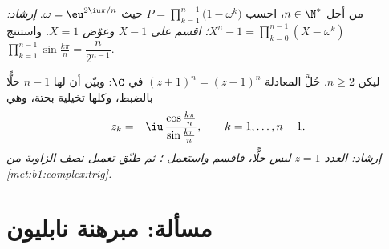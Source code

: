 \begin{exercise}[$\star\star\star$]\label{exo:b1:complex:11}
من أجل $n \in \N^*$، احسب $P = \prod_{k=1}^{n-1}
\bigl(1 - \omega^k\bigr)$ حيث $\omega = \eu^{2\iu\pi/n}$.
\emph{إرشاد: $X^n - 1 = \prod_{k=0}^{n-1} (X - \omega^k)$؛ اقسم على
$X - 1$ وعوّض $X = 1$.} واستنتج
$\prod_{k=1}^{n-1} \sin\frac{k\pi}{n} = \dfrac{n}{2^{n-1}}$.
\end{exercise}

\begin{exercise}[$\star\star$]\label{exo:b1:complex:12}
ليكن $n \geq 2$. حُلَّ المعادلة $(z + 1)^n = (z - 1)^n$ في $\C$:
وبيّن أن لها $n - 1$ حلًّا بالضبط، وكلها تخيلية بحتة، وهي
\[
z_k = -\iu\,\frac{\cos\frac{k\pi}{n}}{\sin\frac{k\pi}{n}},
\qquad k = 1, \dots, n - 1 .
\]
\emph{إرشاد: العدد $z = 1$ ليس حلًّا، فاقسم واستعمل ؛ ثم طبّق تعميل نصف الزاوية من
\cref{met:b1:complex:trig}.}
\end{exercise}

\section{مسألة: مبرهنة نابليون}


